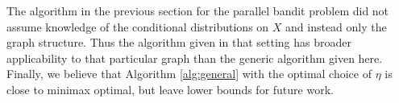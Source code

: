 \begin{remark}
The algorithm in the previous section for the parallel bandit problem did not assume knowledge of the conditional distributions on $X$ and 
instead only the graph structure. Thus the algorithm given in that setting has broader applicability to that particular graph than the generic algorithm given here.
Finally, we believe that Algorithm \ref{alg:general} with the optimal choice of $\eta$ is close to minimax optimal, but leave lower bounds
for future work.
\end{remark}




